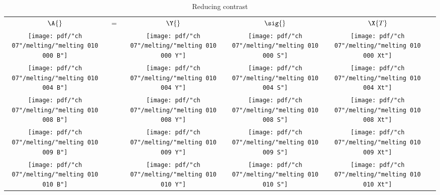 \begin{table}[htdp]
\begin{center}
\begin{tabular}{cccccc}
  $\A{}$ & $=$ & $\Y{}$ & $\sig{}$ & $\X{T}$ \\
  \texttt{[image: pdf/"ch 07"/melting/"melting 010 000 B"]} &&
  \texttt{[image: pdf/"ch 07"/melting/"melting 010 000 Y"]}  &
  \texttt{[image: pdf/"ch 07"/melting/"melting 010 000 S"]}  &
  \texttt{[image: pdf/"ch 07"/melting/"melting 010 000 Xt"]} \\
  \texttt{[image: pdf/"ch 07"/melting/"melting 010 004 B"]} &&
  \texttt{[image: pdf/"ch 07"/melting/"melting 010 004 Y"]}  &
  \texttt{[image: pdf/"ch 07"/melting/"melting 010 004 S"]}  &
  \texttt{[image: pdf/"ch 07"/melting/"melting 010 004 Xt"]} \\
  \texttt{[image: pdf/"ch 07"/melting/"melting 010 008 B"]} &&
  \texttt{[image: pdf/"ch 07"/melting/"melting 010 008 Y"]}  &
  \texttt{[image: pdf/"ch 07"/melting/"melting 010 008 S"]}  &
  \texttt{[image: pdf/"ch 07"/melting/"melting 010 008 Xt"]} \\
  \texttt{[image: pdf/"ch 07"/melting/"melting 010 009 B"]} &&
  \texttt{[image: pdf/"ch 07"/melting/"melting 010 009 Y"]}  &
  \texttt{[image: pdf/"ch 07"/melting/"melting 010 009 S"]}  &
  \texttt{[image: pdf/"ch 07"/melting/"melting 010 009 Xt"]} \\
  \texttt{[image: pdf/"ch 07"/melting/"melting 010 010 B"]} &&
  \texttt{[image: pdf/"ch 07"/melting/"melting 010 010 Y"]}  &
  \texttt{[image: pdf/"ch 07"/melting/"melting 010 010 S"]}  &
  \texttt{[image: pdf/"ch 07"/melting/"melting 010 010 Xt"]} \\
\end{tabular}
\end{center}
\label{tab:jordan:images:melt:1}
\caption[Reducing contrast: SVD components]{Reducing contrast}
\end{table}%

\clearpage
\break

